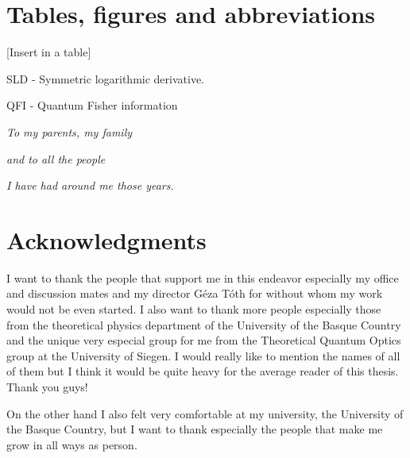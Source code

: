 \documentclass[12pt, letterpaper, twoside]{article}
\numberwithin{equation}{section}
\begin{document}
\vspace*{100pt}
\tableofcontents

\section*{Tables, figures and abbreviations}
\fancyfoot[LE,RO]{\thepage}

[Insert in a table]

SLD - Symmetric logarithmic derivative.

QFI - Quantum Fisher information


\cleardoublepage

\fancyfoot{}

\cleardoublepage
\setcounter{page}{1}

\vspace*{100pt}
\begin{center}
\emph{To my parents, my family}

\emph{and to all the people}

\emph{I have had around me those years.}
\end{center}

\cleardoublepage

\section*{Acknowledgments}

I want to thank the people that support me in this endeavor especially my office and discussion mates and my director G\'eza T\'oth for without whom my work would not be even  started.
I also want to thank more people especially those from the theoretical physics department of the University of the Basque Country and the unique very especial group for me from the Theoretical Quantum Optics group at the University of Siegen.
I would really like to mention the names of all of them but I think it would be quite heavy for the average reader of this thesis. Thank you guys!

On the other hand I also felt very comfortable at my university, the University of the Basque Country, but I want to thank especially the people that make me grow in all ways as person.

\cleardoublepage
\end{document}
